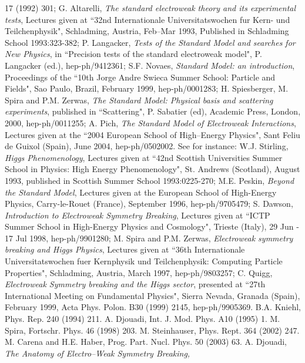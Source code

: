 \begin{thebibliography}{999}
17 (1992) 301; 
%
G. Altarelli, {\it The standard electroweak theory and its experimental tests}, 
Lectures given at ``32nd Internationale Universitatswochen fur Kern- und 
Teilchenphysik", Schladming, Austria, Feb--Mar 1993, Published in Schladming 
School 1993:323-382; 
%
P. Langacker, {\it Tests of the Standard Model and searches for New Physics}, 
in ``Precision tests of the standard electroweak model", P. Langacker (ed.),
hep-ph/9412361; 
S.F. Novaes, {\it Standard Model: an introduction}, Proceedings of the ``10th 
Jorge Andre Swieca Summer School: Particle and Fields", Sao Paulo, Brazil, 
February 1999, hep-ph/0001283; 
H. Spiesberger, M. Spira and P.M. Zerwas, {\it The Standard Model: Physical 
basis and scattering experiments}, published in ``Scattering", P. Sabatier 
(ed),  Academic Press, London, 2000, hep-ph/0011255;
A. Pich, {\it The Standard Model of Electroweak Interactions}, Lectures given
at the ``2004 European School of High--Energy Physics", Sant Feliu de Guixol
(Spain), June 2004, hep-ph/0502002.  
%
 See for instance:  
W.J. Stirling, {\it Higgs Phenomenology}, Lectures given at ``42nd Scottish 
Universities Summer School in Physics: High Energy Phenomenology", 
St. Andrews (Scotland), August 1993, published in Scottish Summer School 
1993:0225-270; 
M.E. Peskin, {\it Beyond the Standard Model}, Lectures given at the European 
School of High-Energy Physics, Carry-le-Rouet (France), September 1996, 
hep-ph/9705479; 
S. Dawson, {\it Introduction to Electroweak Symmetry Breaking}, 
Lectures given at ``ICTP Summer School in High-Energy Physics and 
Cosmology", Trieste (Italy), 29 Jun - 17 Jul 1998, hep-ph/9901280;  
M. Spira and P.M. Zerwas, {\it Electroweak symmetry breaking and Higgs Physics},
Lectures given at ``36th Internationale Universitatswochen fuer Kernphysik und 
Teilchenphysik: Computing Particle Properties", Schladming, Austria, March 1997,
hep-ph/9803257; 
C. Quigg, {\it Electroweak Symmetry breaking and the Higgs sector}, presented 
at ``27th International Meeting on Fundamental Physics", Sierra Nevada, 
Granada (Spain), February 1999, Acta Phys. Polon. B30 (1999) 2145, 
hep-ph/9905369. 
%
 B.A. Kniehl, Phys. Rep. 240 (1994) 211.
%
 A. Djouadi, Int. J. Mod. Phys. A10 (1995) 1.
%
 M. Spira, Fortschr. Phys. 46 (1998) 203. 
%
 M. Steinhauser, Phys. Rept. 364 (2002) 247. 
%
 M. Carena and H.E. Haber, Prog. Part. Nucl. Phys. 50 
(2003) 63. 
%
 A. Djouadi, {\it The Anatomy of Electro--Weak Symmetry Breaking,
}
\end{thebibliography}
